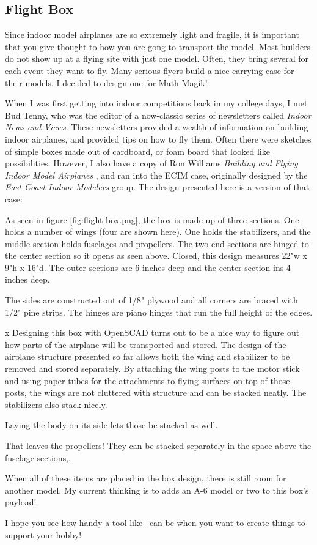 \subsection{Flight Box}

Since indoor model airplanes are so extremely light and fragile, it is
important that you give thought to how you are gong to transport the model.
Most builders do not show up at a flying site with just one model. Often, they
bring several for each event they want to fly. Many serious flyers build a nice
carrying case for their models. I decided to design one for Math-Magik!

When I was first getting into indoor competitions back in my college days, I
met Bud Tenny, who was the editor of a now-classic series of newsletters called
{\it Indoor News and Views}. These newsletters provided a wealth of information on
building indoor airplanes, and provided tips on how to fly them. Often there
were sketches of simple boxes made out of cardboard, or foam board that looked
like possibilities. However, I also have a copy of Ron Williams {\it Building and
Flying Indoor Model Airplanes} \cite{williams} , and ran into the ECIM
case, originally designed by the {\it East Coast Indoor Modelers} group. The design
presented here is a version of that case:


As seen in figure \ref{fig:flight-box.png}, the box is made up of three
sections. One holds a number of wings (four are shown here). One holds the
stabilizers, and the middle section holds fuselages and propellers. The two end
sections are hinged to the center section so it opens as seen above. Closed,
this design measures 22"w x 9"h x 16"d. The outer sections are 6 inches deep
and the center section ins 4 inches deep.

The sides are constructed out of 1/8" plywood and all corners are braced with
1/2" pine strips. The hinges are piano hinges that run the full height of the
edges.

x
Designing this box with OpenSCAD turns out to be a nice way to figure out how
parts of the airplane will be transported and stored. The design of the
airplane structure presented so far allows both the wing and stabilizer to be
removed and stored separately. By attaching the wing posts to the motor stick and
using paper tubes for the attachments to flying surfaces on top of those posts,
the wings are not cluttered with structure and can be stacked neatly. The
stabilizers also stack nicely.

Laying the body on its side lets those be stacked as well.

That leaves the propellers! They can be stacked separately in the space above
the fuselage sections,.

When all of these items are placed in the box design, there is still room for
another model. My current thinking is to adds an A-6 model or two to this box's
payload!

I hope you see how handy a tool like \osc\ can be when you want to create
things to support your hobby!
